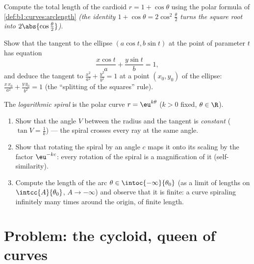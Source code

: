 \begin{exercise}[$\star\star$]\label{exo:b1:curves:10}
Compute the total length of the cardioid $r = 1 + \cos\theta$
using the polar formula of \cref{def:b1:curves:arclength}
\emph{(the identity $1 + \cos\theta = 2\cos^2\frac\theta2$ turns
the square root into $2\abs{\cos\frac\theta2}$)}.
\end{exercise}

\begin{exercise}[$\star\star$]\label{exo:b1:curves:11}
Show that the tangent to the ellipse $(a\cos t, b\sin t)$ at the
point of parameter $t$ has equation
\[
\frac{x\cos t}{a} + \frac{y\sin t}{b} = 1 ,
\]
and deduce the tangent to $\frac{x^2}{a^2} + \frac{y^2}{b^2} = 1$
at a point $(x_0, y_0)$ of the ellipse: $\frac{x\,x_0}{a^2} +
\frac{y\,y_0}{b^2} = 1$ (the ``splitting of the squares'' rule).
\end{exercise}

\begin{exercise}[$\star\star\star$]\label{exo:b1:curves:12}
The \emph{logarithmic spiral} is the polar curve $r =
\eu^{k\theta}$ ($k > 0$ fixed, $\theta \in \R$).
\begin{enumerate}
  \item Show that the angle $V$ between the radius and the
        tangent is \emph{constant} ($\tan V = \frac1k$) --- the
        spiral crosses every ray at the same angle.
  \item Show that rotating the spiral by an angle $c$ maps it
        onto its scaling by the factor $\eu^{-kc}$: every
        rotation of the spiral is a magnification of it
        (self-similarity).
  \item Compute the length of the arc $\theta \in
        \intoc{-\infty}{\theta_0}$ (as a limit of lengths on
        $\intcc{A}{\theta_0}$, $A \to -\infty$) and observe that
        it is finite: a curve spiraling infinitely many times
        around the origin, of finite length.
\end{enumerate}
\end{exercise}

\section{Problem: the cycloid, queen of curves}

